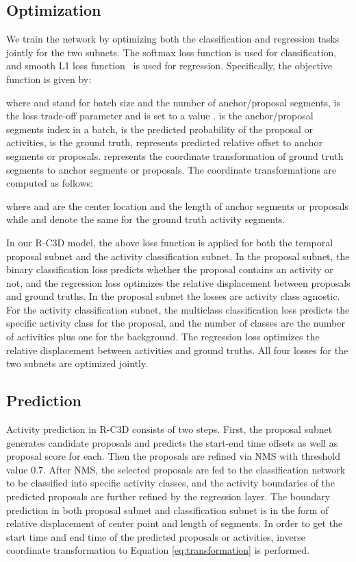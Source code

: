 \documentclass[10pt,twocolumn,letterpaper]{article}
\newcommand{\modelname}[0]{R-C3D }
\begin{document}
\subsection{Optimization}
\label{sec:optimization}
We train the network by optimizing both the classification and regression tasks jointly for the two subnets.
The softmax loss function is used for classification, and smooth L1 loss function~\cite{girshick2015fast} is used for regression.
Specifically, the objective function is given by:
\small

\normalsize
where  and  stand for batch size and the number of anchor/proposal segments,  is the loss trade-off parameter and is set to a value .
 is the anchor/proposal segments index in a batch,  is the predicted probability of the proposal or activities,  is the ground truth,  represents predicted relative offset to anchor segments or proposals.
 represents the coordinate transformation of ground truth segments to anchor segments or proposals. The coordinate transformations are computed as follows:

where  and  are the center location and the length of anchor segments or proposals while  and  denote the same for the ground truth activity segments.

In our \modelname model, the above loss function is applied for both the temporal proposal subnet and the activity classification subnet.
In the proposal subnet, the binary classification loss  predicts whether the proposal contains an activity or not, and the regression loss  optimizes the relative displacement between proposals and ground truths.
In the proposal subnet the losses are activity class agnostic.
For the activity classification subnet, the multiclass classification loss  predicts the specific activity class for the proposal, and the number of classes are the number of activities plus one for the background.
The regression loss  optimizes the relative displacement between activities and ground truths.
All four losses for the two subnets are optimized jointly.


\subsection{Prediction}
\label{sec:prediction}
Activity prediction in R-C3D consists of two steps.
First, the proposal subnet generates candidate proposals and predicts the start-end time offsets as well as proposal score for each.
Then the proposals are refined via NMS with threshold value 0.7.
After NMS, the selected proposals are fed to the classification network to be classified into specific activity classes, and the activity boundaries of the predicted proposals are further refined by the regression layer.
The boundary prediction in both proposal subnet and classification subnet is in the form of relative displacement of center point and length of segments.
In order to get the start time and end time of the predicted proposals or activities, inverse coordinate transformation to Equation \ref{eq:transformation} is performed.
\end{document}
